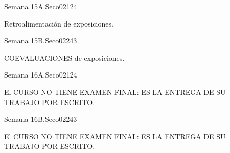 \begin{syllabus}
\begin{unit}{Semana 15A.}{Seco02}{12}{4}
   \begin{topics}
      \item Retroalimentación de exposiciones.
   \end{topics}
   \begin{unitgoals}
      \item 
   \end{unitgoals}
\end{unit}

\begin{unit}{Semana 15B.}{Seco02}{24}{3}
   \begin{topics}
      \item COEVALUACIONES de exposiciones.
   \end{topics}

   \begin{unitgoals}
      \item 
      \item
      \item 
      \end{unitgoals}
\end{unit}

\begin{unit}{Semana 16A.}{Seco02}{12}{4}
   \begin{topics}
      \item El CURSO NO TIENE EXAMEN FINAL: ES LA ENTREGA DE SU TRABAJO POR ESCRITO.
   \end{topics}
   \begin{unitgoals}
      \item 
   \end{unitgoals}
\end{unit}

\begin{unit}{Semana 16B.}{Seco02}{24}{3}
   \begin{topics}
      \item El CURSO NO TIENE EXAMEN FINAL: ES LA ENTREGA DE SU TRABAJO POR ESCRITO.
   \end{topics}

   \begin{unitgoals}
      \item 
      \item
      \item 
      \end{unitgoals}
\end{unit}


\begin{coursebibliography}
\end{coursebibliography}

\end{syllabus}
